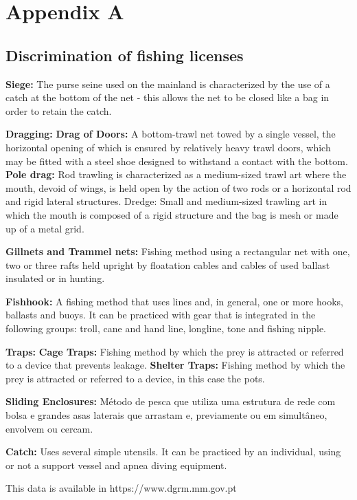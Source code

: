 \chapter{Appendix A} 
\label{appendix:anexo1}

\section{Discrimination of fishing licenses}

{\Large \textbf{ Siege:}}
The purse seine used on the mainland is characterized by the use of a catch at the bottom of the net - this allows the net to be closed like a bag in order to retain the catch.

{\Large\textbf{Dragging:}}
\textbf{Drag of Doors: }A bottom-trawl net towed by a single vessel, the horizontal opening of which is ensured by relatively heavy trawl doors, which may be fitted with a steel shoe designed to withstand a contact with the bottom.
\textbf{Pole drag:} Rod trawling is characterized as a medium-sized trawl art where the mouth, devoid of wings, is held open by the action of two rods or a horizontal rod and rigid lateral structures.
Dredge: Small and medium-sized trawling art in which the mouth is composed of a rigid structure and the bag is mesh or made up of a metal grid.

{\Large\textbf{Gillnets and Trammel nets:}}
Fishing method using a rectangular net with one, two or three rafts held upright by floatation cables and cables of used ballast insulated or in hunting.

{\Large\textbf{Fishhook:}}
A fishing method that uses lines and, in general, one or more hooks, ballasts and buoys. It can be practiced with gear that is integrated in the following groups: troll, cane and hand line, longline, tone and fishing nipple.

{\Large\textbf{Traps:}}
\textbf{Cage Traps:} Fishing method by which the prey is attracted or referred to a device that prevents leakage. 
\textbf{Shelter Traps:} Fishing method by which the prey is attracted or referred to a device, in this case the pots.

{\Large\textbf{Sliding Enclosures:}}
Método de pesca que utiliza uma estrutura de rede com bolsa e grandes asas laterais que arrastam e, previamente ou em simultâneo, envolvem ou cercam.

{\Large\textbf{Catch:}}
Uses several simple utensils. It can be practiced by an individual, using or not a support vessel and apnea diving equipment.

This data is available in https://www.dgrm.mm.gov.pt 
